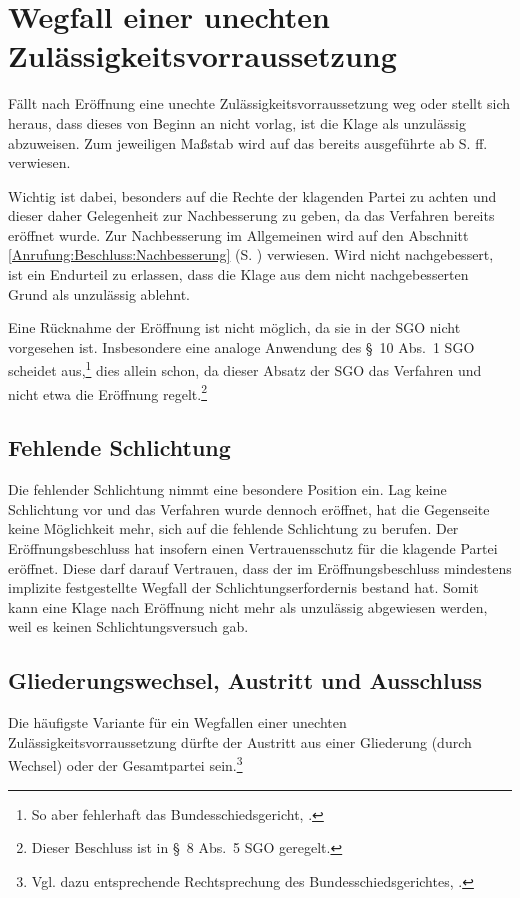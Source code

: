 \section{Wegfall einer unechten Zulässigkeitsvorraussetzung}
\label{Zulaessigkeit:Wegfall}
Fällt nach Eröffnung eine unechte Zulässigkeitsvorraussetzung weg oder stellt sich heraus, dass dieses von Beginn an nicht vorlag, ist die Klage als unzulässig abzuweisen.
Zum jeweiligen Maßstab wird auf das bereits ausgeführte ab S. \pageref{Anrufung:Statthaftigkeit} ff. verwiesen.

Wichtig ist dabei, besonders auf die Rechte der klagenden Partei zu achten und dieser daher Gelegenheit zur Nachbesserung zu geben, da das Verfahren bereits eröffnet wurde.
Zur Nachbesserung im Allgemeinen wird auf den Abschnitt \ref{Anrufung:Beschluss:Nachbesserung} (S. \pageref{Anrufung:Beschluss:Nachbesserung}) verwiesen.
Wird nicht nachgebessert, ist ein Endurteil zu erlassen, dass die Klage aus dem nicht nachgebesserten Grund als unzulässig ablehnt.

Eine Rücknahme der Eröffnung ist nicht möglich, da sie in der SGO nicht vorgesehen ist.
Insbesondere eine analoge Anwendung des \S~10 Abs.~1 SGO scheidet aus,\footnote{So aber fehlerhaft das Bundesschiedsgericht, \cite{BSGPP100127862}.} dies allein schon, da dieser Absatz der SGO das Verfahren und nicht etwa die Eröffnung regelt.\footnote{Dieser Beschluss ist in \S~8 Abs.~5 SGO geregelt.}

\subsection{Fehlende Schlichtung}
\label{Zulaessigkeit:Wegfall:Schlichtung}
Die fehlender Schlichtung nimmt eine besondere Position ein.
Lag keine Schlichtung vor und das Verfahren wurde dennoch eröffnet, hat die Gegenseite keine Möglichkeit mehr, sich auf die fehlende Schlichtung zu berufen.
Der Eröffnungsbeschluss hat insofern einen Vertrauensschutz für die klagende Partei eröffnet.
Diese darf darauf Vertrauen, dass der im Eröffnungsbeschluss mindestens implizite festgestellte Wegfall der Schlichtungserfordernis bestand hat.
Somit kann eine Klage nach Eröffnung nicht mehr als unzulässig abgewiesen werden, weil es keinen Schlichtungsversuch gab.

\subsection{Gliederungswechsel, Austritt und Ausschluss}
\label{Zulaessigkeit:Wegfall:Austritt}
Die häufigste Variante für ein Wegfallen einer unechten Zulässigkeitsvorraussetzung dürfte der Austritt aus einer Gliederung (durch Wechsel) oder der Gesamtpartei sein.\footnote{Vgl. dazu entsprechende Rechtsprechung des Bundesschiedsgerichtes, \cites{BSG20121128}{BSG20130116}.}

